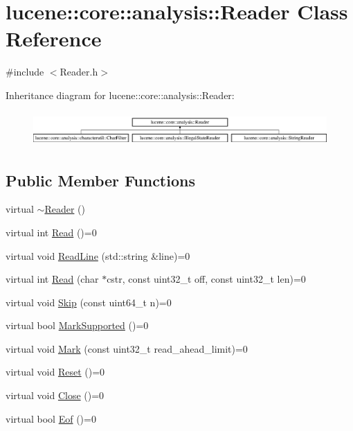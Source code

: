 \hypertarget{classlucene_1_1core_1_1analysis_1_1Reader}{}\section{lucene\+:\+:core\+:\+:analysis\+:\+:Reader Class Reference}
\label{classlucene_1_1core_1_1analysis_1_1Reader}


{\ttfamily \#include $<$Reader.\+h$>$}

Inheritance diagram for lucene\+:\+:core\+:\+:analysis\+:\+:Reader\+:\begin{figure}[H]
\begin{center}
\leavevmode
\includegraphics[height=1.323877cm]{classlucene_1_1core_1_1analysis_1_1Reader}
\end{center}
\end{figure}
\subsection*{Public Member Functions}
\begin{DoxyCompactItemize}
\item 
virtual \mbox{\hyperlink{classlucene_1_1core_1_1analysis_1_1Reader_a78089542fd27a0ac2df6702fffe8725c}{$\sim$\+Reader}} ()
\item 
virtual int \mbox{\hyperlink{classlucene_1_1core_1_1analysis_1_1Reader_ae8e04911b6a4c06bb026ca6e74071cb2}{Read}} ()=0
\item 
virtual void \mbox{\hyperlink{classlucene_1_1core_1_1analysis_1_1Reader_a475ba046fd74e43a1cce4c4702c791c2}{Read\+Line}} (std\+::string \&line)=0
\item 
virtual int \mbox{\hyperlink{classlucene_1_1core_1_1analysis_1_1Reader_a986e25a49a947dc113a22c6de033ebe9}{Read}} (char $\ast$cstr, const uint32\+\_\+t off, const uint32\+\_\+t len)=0
\item 
virtual void \mbox{\hyperlink{classlucene_1_1core_1_1analysis_1_1Reader_a3bd8e9f3e1d07d698bccabde41970219}{Skip}} (const uint64\+\_\+t n)=0
\item 
virtual bool \mbox{\hyperlink{classlucene_1_1core_1_1analysis_1_1Reader_a230fae02ca4a63de33fdaad6f9aafd96}{Mark\+Supported}} ()=0
\item 
virtual void \mbox{\hyperlink{classlucene_1_1core_1_1analysis_1_1Reader_a0b60b07a3f65098a50f10f6618097527}{Mark}} (const uint32\+\_\+t read\+\_\+ahead\+\_\+limit)=0
\item 
virtual void \mbox{\hyperlink{classlucene_1_1core_1_1analysis_1_1Reader_a5299f5469ce4ea9812ec79a59667945a}{Reset}} ()=0
\item 
virtual void \mbox{\hyperlink{classlucene_1_1core_1_1analysis_1_1Reader_a4be7e96dccdd3e276e3450e3ad7a70f4}{Close}} ()=0
\item 
virtual bool \mbox{\hyperlink{classlucene_1_1core_1_1analysis_1_1Reader_af7a24f3904f9c40e9c5c204b3434f1f7}{Eof}} ()=0
\end{DoxyCompactItemize}


